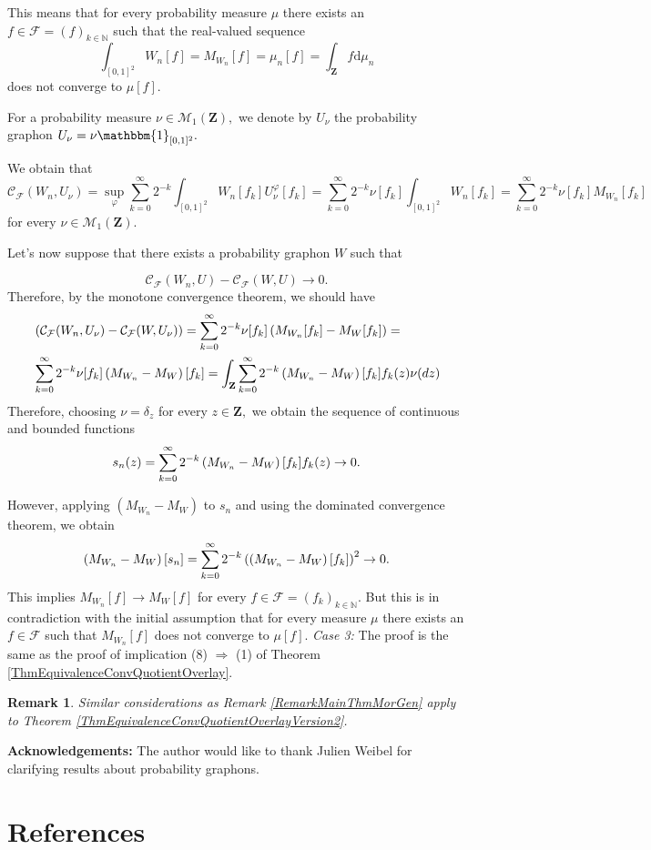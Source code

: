 \documentclass[11pt]{article}
\newtheorem{remark}[theorem]{Remark}
\def\N{\mathbb{N}}
\newcommand{\cC}{{\mathcal C}}  %
\newcommand{\cF}{{\mathcal F}}  %
\newcommand{\Space}{\mathbf{Z}}
\newcommand{\Proba}{\mathcal{M}_1(\Space)}
\begin{document}
This means that for every probability measure $\mu$ there exists an $f\in \cF=(f)_{k\in \N}$ such that the real-valued sequence $$
\int_{[0,1]^2}W_n[f]=M_{W_n}[f]=\mu_n[f]=\int_{\Space}f\mathrm{d}\mu_n
$$
does not converge to $\mu[f].$ 

For a probability measure $\nu \in \Proba,$ we denote by $U_{\nu}$ the probability graphon  $U_{\nu}=\nu\mathbbm{1}_{[0,1]^2}.$

We obtain that 
$$
\cC_{\cF}(W_n,U_{\nu})=\sup_{\varphi}\sum^{\infty}_{k=0}2^{-k}\int_{[0,1]^2}W_n[f_k]U_{\nu}^{\varphi}[f_k]=\sum^{\infty}_{k=0}2^{-k}\nu[f_k]\int_{[0,1]^2}W_n[f_k]=\sum^{\infty}_{k=0}2^{-k}\nu[f_k]M_{W_n}[f_k]$$
 for every $\nu\in \Proba.$  

Let's now suppose that there exists a probability graphon $W$ such that 

$$
\cC_{\cF}(W_n,U)-\cC_{\cF}(W,U)\rightarrow 0.
$$
Therefore, by the monotone convergence theorem, we should have 
$$
\begin{aligned}
&    \left(\cC_{\cF}(W_n,U_{\nu})-\cC_{\cF}(W,U_{\nu})\right)=\sum^{\infty}_{k=0}2^{-k}\nu[f_k]\left(M_{W_n}[f_k]-M_{W}[f_k]\right)=\\
&\sum^{\infty}_{k=0}2^{-k}\nu[f_k]\left(M_{W_n}-M_{W}\right)[f_k]=\int_{\Space}\sum^{\infty}_{k=0}\space2^{-k}\left(M_{W_n}-M_{W}\right)[f_k]f_k(z) \nu(dz)
\end{aligned}
$$
Therefore, choosing $\nu=\delta_z$ for every $z\in \Space,$ we obtain the sequence of continuous and bounded functions 
$$
s_n(z)=\sum^{\infty}_{k=0}\space2^{-k}\left(M_{W_n}-M_{W}\right)[f_k]f_k(z) \rightarrow0.
$$

However, applying $\left(M_{W_n}-M_{W}\right)$ to $s_n$ and using the dominated convergence theorem, we obtain  
$$
\left(M_{W_n}-M_{W}\right)[s_n]=\sum^{\infty}_{k=0}\space2^{-k}\left(\left(M_{W_n}-M_{W}\right)[f_k]\right)^2\rightarrow 0.
$$
This implies $M_{W_n}[f]\rightarrow M_{W}[f] $ for every $f\in \cF=(f_k)_{k\in \N}.$ But this is in contradiction with the initial assumption that for every measure $\mu$ there exists an $f\in \cF$ such that $M_{W_n}[f]$ does not converge to $\mu[f].$  \newline
\emph{Case 3:}
The proof is the same as the proof of implication (8) $\Rightarrow$ (1) of  Theorem \ref{ThmEquivalenceConvQuotientOverlay}.\newline


\endproof


\begin{remark}
Similar considerations as Remark \ref{RemarkMainThmMorGen} apply to Theorem \ref{ThmEquivalenceConvQuotientOverlayVersion2}.
\end{remark}

\textbf{Acknowledgements:}  The author would like to thank Julien Weibel for clarifying results about probability graphons.
\medskip
\section*{References}


 

\end{document}
